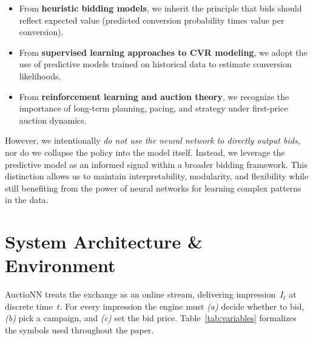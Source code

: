 \documentclass[11pt]{article}
\begin{document}
\begin{itemize}
    \item From \textbf{heuristic bidding models}, we inherit the principle that bids should reflect expected value (predicted conversion probability times value per conversion).
    \item From \textbf{supervised learning approaches to CVR modeling}, we adopt the use of predictive models trained on historical data to estimate conversion likelihoods.
    \item From \textbf{reinforcement learning and auction theory}, we recognize the importance of long-term planning, pacing, and strategy under first-price auction dynamics.
\end{itemize}

However, we intentionally \emph{do not use the neural network to directly output bids}, nor do we collapse the policy into the model itself. Instead, we leverage the predictive model as an informed signal within a broader bidding framework. This distinction allows us to maintain interpretability, modularity, and flexibility while still benefiting from the power of neural networks for learning complex patterns in the data.

\section{System Architecture \& Environment}\label{sec:env}

AuctioNN treats the exchange as an online stream, delivering
impression~$I_t$ at discrete time~$t$.
For every impression the engine must
\emph{(a)} decide whether to bid,
\emph{(b)} pick a campaign, and
\emph{(c)} set the bid price.
Table~\ref{tab:variables} formalizes the symbols used throughout the paper.
\end{document}
